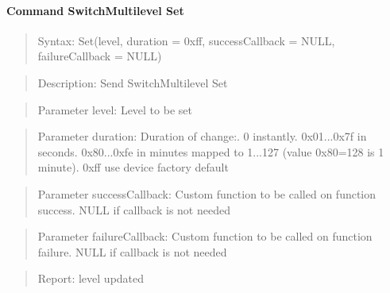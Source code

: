 \paragraph{Command SwitchMultilevel Set}
\begin{quote}Syntax: Set(level, duration = 0xff, successCallback = NULL, failureCallback = NULL)\end{quote}
\begin{quote}Description: Send SwitchMultilevel Set\end{quote}
\begin{quote}Parameter level: Level to be set\end{quote}
\begin{quote}Parameter duration: Duration of change:. 0 instantly. 0x01...0x7f in seconds. 0x80...0xfe in minutes mapped to 1...127 (value 0x80=128 is 1 minute). 0xff use device factory default\end{quote}
\begin{quote}Parameter successCallback: Custom function to be called on function success. NULL if callback is not needed\end{quote}
\begin{quote}Parameter failureCallback: Custom function to be called on function failure. NULL if callback is not needed\end{quote}
\begin{quote}Report: level updated\end{quote}

